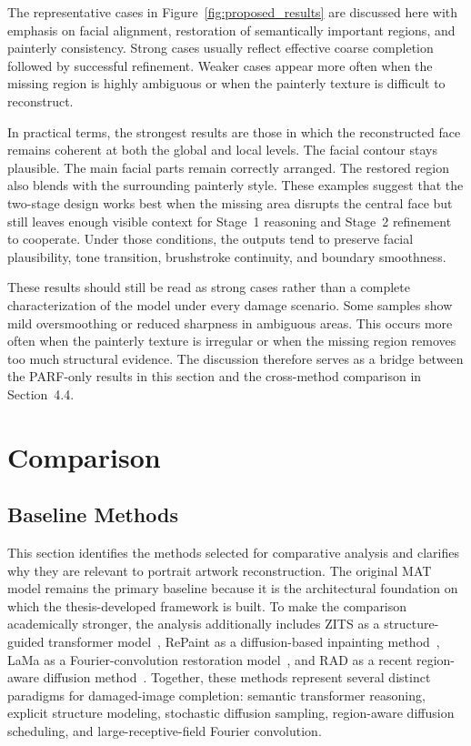 \documentclass[12pt, twoside]{report}
\begin{document}
The representative cases in Figure~\ref{fig:proposed_results} are discussed here with emphasis on facial alignment, restoration of semantically important regions, and painterly consistency. Strong cases usually reflect effective coarse completion followed by successful refinement. Weaker cases appear more often when the missing region is highly ambiguous or when the painterly texture is difficult to reconstruct.

In practical terms, the strongest results are those in which the reconstructed face remains coherent at both the global and local levels. The facial contour stays plausible. The main facial parts remain correctly arranged. The restored region also blends with the surrounding painterly style. These examples suggest that the two-stage design works best when the missing area disrupts the central face but still leaves enough visible context for Stage~1 reasoning and Stage~2 refinement to cooperate. Under those conditions, the outputs tend to preserve facial plausibility, tone transition, brushstroke continuity, and boundary smoothness.

These results should still be read as strong cases rather than a complete characterization of the model under every damage scenario. Some samples show mild oversmoothing or reduced sharpness in ambiguous areas. This occurs more often when the painterly texture is irregular or when the missing region removes too much structural evidence. The discussion therefore serves as a bridge between the PARF-only results in this section and the cross-method comparison in Section~4.4.

\section{Comparison}

\subsection{Baseline Methods}

This section identifies the methods selected for comparative analysis and clarifies why they are relevant to portrait artwork reconstruction. The original MAT model remains the primary baseline because it is the architectural foundation on which the thesis-developed framework is built. To make the comparison academically stronger, the analysis additionally includes ZITS as a structure-guided transformer model~\cite{zeng2022zits}, RePaint as a diffusion-based inpainting method~\cite{lugmayr2022repaint}, LaMa as a Fourier-convolution restoration model~\cite{suvorov2022lama}, and RAD as a recent region-aware diffusion method~\cite{kim2025rad}. Together, these methods represent several distinct paradigms for damaged-image completion: semantic transformer reasoning, explicit structure modeling, stochastic diffusion sampling, region-aware diffusion scheduling, and large-receptive-field Fourier convolution.
\end{document}

